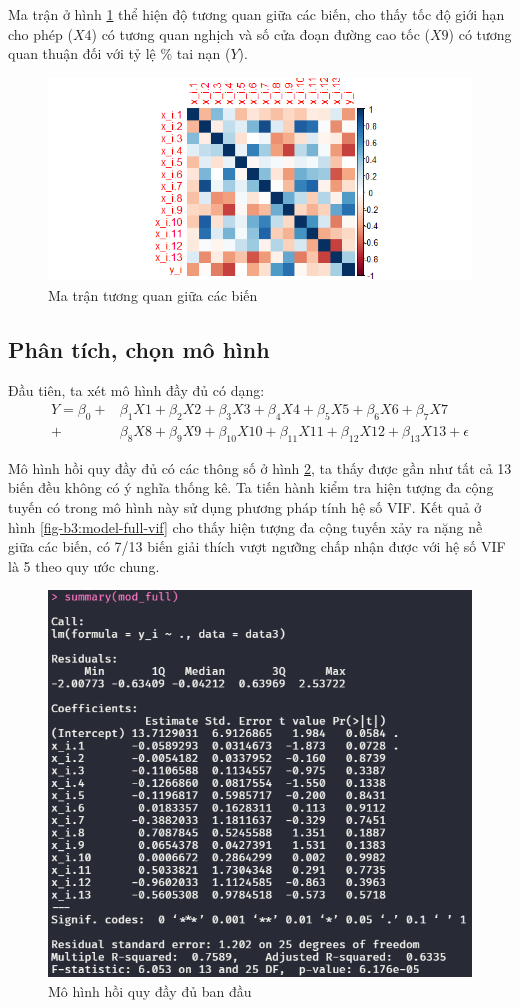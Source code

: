 Ma trận ở hình \ref{fig-b3:dataset-corr} thể hiện độ tương quan giữa các biến, cho thấy tốc độ giới hạn cho phép ($X4$) có tương quan nghịch và số cửa đoạn đường cao tốc ($X9$) có tương quan thuận đối với tỷ lệ \% tai nạn ($Y$).
\begin{figure}[H]
	\centering
	\includegraphics[width=0.85\linewidth]{images/B3/dataset-corr}
	\caption{Ma trận tương quan giữa các biến}
	\label{fig-b3:dataset-corr}
\end{figure}

\subsection*{Phân tích, chọn mô hình}
Đầu tiên, ta xét mô hình đầy đủ có dạng:
\begin{equation}\label{b3-model-full}
	\begin{split}
		Y = \beta_0 + &\beta_1X1 + \beta_2X2 + \beta_3X3 + \beta_4X4 + \beta_5X5 + \beta_6X6 + \beta_7X7\\ + &\beta_8X8 + \beta_9X9 + \beta_{10}X10 + \beta_{11}X11 + \beta_{12}X12 + \beta_{13}X13 + \epsilon
	\end{split}
\end{equation}

Mô hình hồi quy đầy đủ có các thông số ở hình \ref{fig-b3:model-full}, ta thấy được gần như tất cả 13 biến đều không có ý nghĩa thống kê. Ta tiến hành kiểm tra hiện tượng đa cộng tuyến có trong mô hình này sử dụng phương pháp tính hệ số VIF. Kết quả ở hình \ref{fig-b3:model-full-vif} cho thấy hiện tượng đa cộng tuyến xảy ra nặng nề giữa các biến, có 7/13 biến giải thích vượt ngưỡng chấp nhận được với hệ số VIF là 5 theo quy ước chung.

\begin{figure}[H]
	\centering
	\includegraphics[width=0.65\linewidth]{images/B3/model-full}
	\caption{Mô hình hồi quy đầy đủ ban đầu}
	\label{fig-b3:model-full}
\end{figure}

